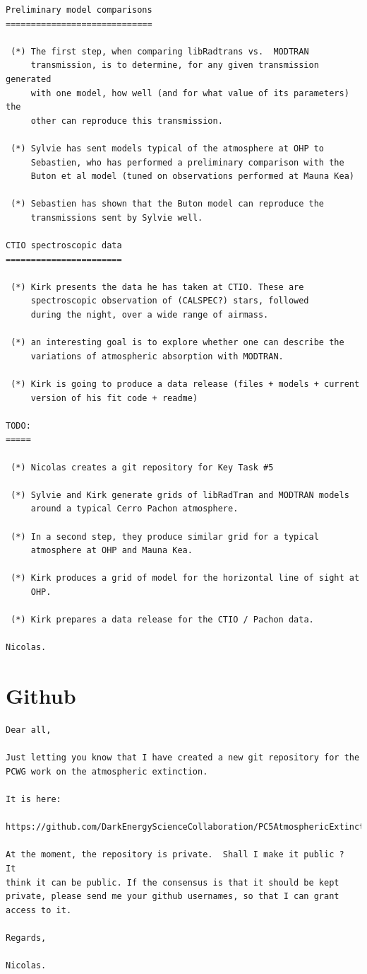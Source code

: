 \documentclass[a4paper]{article}
\begin{document}
\begin{verbatim}
Preliminary model comparisons
=============================

 (*) The first step, when comparing libRadtrans vs.  MODTRAN
     transmission, is to determine, for any given transmission generated
     with one model, how well (and for what value of its parameters) the
     other can reproduce this transmission.

 (*) Sylvie has sent models typical of the atmosphere at OHP to
     Sebastien, who has performed a preliminary comparison with the
     Buton et al model (tuned on observations performed at Mauna Kea)

 (*) Sebastien has shown that the Buton model can reproduce the
     transmissions sent by Sylvie well. 

CTIO spectroscopic data
=======================

 (*) Kirk presents the data he has taken at CTIO. These are
     spectroscopic observation of (CALSPEC?) stars, followed 
     during the night, over a wide range of airmass.

 (*) an interesting goal is to explore whether one can describe the
     variations of atmospheric absorption with MODTRAN.

 (*) Kirk is going to produce a data release (files + models + current
     version of his fit code + readme)

TODO:
=====

 (*) Nicolas creates a git repository for Key Task #5

 (*) Sylvie and Kirk generate grids of libRadTran and MODTRAN models
     around a typical Cerro Pachon atmosphere.

 (*) In a second step, they produce similar grid for a typical
     atmosphere at OHP and Mauna Kea.

 (*) Kirk produces a grid of model for the horizontal line of sight at
     OHP.

 (*) Kirk prepares a data release for the CTIO / Pachon data.

Nicolas.
\end{verbatim}

\section*{Github}
\begin{verbatim}
Dear all, 

Just letting you know that I have created a new git repository for the
PCWG work on the atmospheric extinction. 

It is here:

https://github.com/DarkEnergyScienceCollaboration/PC5AtmosphericExtinction

At the moment, the repository is private.  Shall I make it public ?  It
think it can be public. If the consensus is that it should be kept
private, please send me your github usernames, so that I can grant
access to it.

Regards, 

Nicolas.
\end{verbatim}
\end{document}
